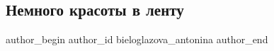  
 
 
 
 
 
\subsection{Немного красоты в ленту}
\label{sec:06_12_2021.fb.bieloglazova_antonina.1.krasota}
 
\ifcmt
 author_begin
   author_id bieloglazova_antonina
 author_end
\fi

